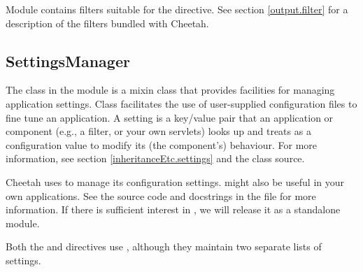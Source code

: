 Module  contains filters suitable for the 
directive.  See section \ref{output.filter} for a description of the
filters bundled with Cheetah.

\subsection{SettingsManager}
\label{libraries.SettingsManager}

The  class in the  module is
a mixin class that provides facilities for managing application settings.  
Class  facilitates the use of
user-supplied configuration files to fine tune an application.  A setting is
a key/value pair that an application or component (e.g., a filter, or your 
own servlets) looks up and treats as a configuration value to modify its (the
component's) behaviour.  For more information, see section
\ref{inheritanceEtc.settings} and the class source.

Cheetah uses  to manage its configuration settings.
 might also be useful in your own applications. See the
source code and docstrings in the file  for more
information. If there is sufficient interest in , we will
release it as a standalone module.

Both the  and  directives use
, although they maintain two separate lists of settings.





